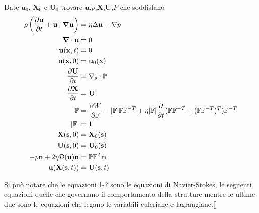 \begin{problem}
Date $\mathbf{u}_0$, $\mathbf{X}_0$ e $\mathbf{U}_0$ trovare $\mathbf{u}$,$p$,$\mathbf{X}$,$\mathbf{U}$,$P$ che soddisfano
\begin{equation}
\begin{aligned}
\rho \left ( \frac{\partial \mathbf{u}}{\partial t} + \mathbf{u} \cdot \boldsymbol{\nabla} \mathbf{u} \right ) &= \eta \Delta \mathbf{u} - \nabla p \\
\boldsymbol{\nabla} \cdot \mathbf{u} &= 0 \\
\mathbf{u}(\mathbf{x},t)&=0 \\
\mathbf{u}(\mathbf{x},0)&=\mathbf{u}_0(\mathbf{x}) \\
\frac{\partial \mathbf{U}}{\partial t} &= \nabla_s\cdot\mathbb{P}\\
\frac{\partial \mathbf{X}}{\partial t} &= \mathbf{U}\\
\mathbb{P} &= \frac{\partial W}{\partial \mathbb{F}}-|\mathbb{F}|\mathbb{P}\mathbb{F}^{-T}+\eta|\mathbb{F}|\frac{\partial}{\partial t}(\mathbb{F}\mathbb{F}^{-T}+(\mathbb{F}\mathbb{F}^{-T})^{T})\mathbb{F}^{-T}\\
|\mathbb{F}|&=1\\
\mathbf{X}(\mathbf{s},0)&=\mathbf{X}_0(\mathbf{s})\\
\mathbf{U}(\mathbf{s},0)&=\mathbf{U}_0(\mathbf{s})\\
-p\mathbf{n}+2\eta\mathcal{D}(\mathbf{n})\mathbf{n}&=\mathbb{P}\mathbb{F}^T\mathbf{n}\\
\mathbf{u}(\mathbf{X}(\mathbf{s},t))&=\mathbf{U}(\mathbf{s},t)
\end{aligned}
\end{equation}
\end{problem}
Si può notare che le equazioni 1-? sono le equazioni di Navier-Stokes, le seguenti equazioni quelle che governano il comportamento della strutture mentre le ultime due sono le equazioni che legano le variabili euleriane e lagrangiane.[]

